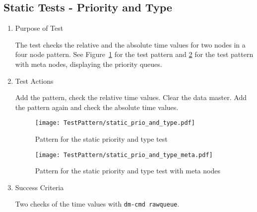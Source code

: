 \subsection{Static Tests - Priority and Type}
\begin{enumerate}
	\item Purpose of Test

The test checks the relative and the absolute time values for two nodes in a four node pattern. 
See Figure~\ref{fig:Pattern_for_the_static_priority_and_type_test} for the test pattern 
and \ref{fig:Pattern_for_the_static_priority_and_type_test_with_meta_nodes} for the test pattern with meta nodes, 
displaying the priority queues.
	\item Test Actions

	Add the pattern, check the relative time values. Clear the data master. Add the pattern again and check the absolute time values.
    \begin{figure}
        \centering 
        \texttt{[image: TestPattern/static\_prio\_and\_type.pdf]}
        \caption{Pattern for the static priority and type test}
        \label{fig:Pattern_for_the_static_priority_and_type_test}
    \end{figure}
    \begin{figure}
        \centering 
        \texttt{[image: TestPattern/static\_prio\_and\_type\_meta.pdf]}
        \caption{Pattern for the static priority and type test with meta nodes}
        \label{fig:Pattern_for_the_static_priority_and_type_test_with_meta_nodes}
    \end{figure}
	\item Success Criteria

	Two checks of the time values with \texttt{dm-cmd rawqueue}.
\end{enumerate}
